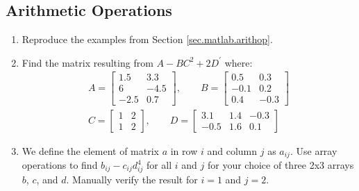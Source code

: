 \subsection{Arithmetic Operations}
\begin{enumerate}
    \item Reproduce the examples from Section \ref{sec.matlab.arithop}.
    \item Find the matrix resulting from $A-BC^2+2D^\prime$ where:
    \begin{gather*}
    A = \left[ \begin{array}{rr} 1.5&3.3\\6&-4.5\\-2.5&0.7\end{array} \right], \qquad B=\left[\begin{array}{rr}0.5&0.3\\-0.1&0.2\\0.4&-0.3\end{array} \right] \\
    C = \left[\begin{array}{rr}1&2\\1&2\end{array}\right], \qquad
    D = \left[\begin{array}{rrr}3.1&1.4&-0.3\\-0.5&1.6&0.1\end{array} \right]
    \end{gather*}
    \item We define the element of matrix $a$ in row $i$ and column $j$ as $a_{ij}$.  Use array operations to find $b_{ij}-c_{ij}d_{ij}^4$ for all $i$ and $j$ for your choice of three 2x3 arrays $b$, $c$, and $d$.  Manually verify the result for $i=1$ and $j=2$.
\end{enumerate}

